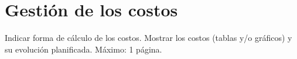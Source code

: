 \section{Gestión de los costos}

Indicar forma de cálculo de los costos.
Mostrar los costos (tablas y/o gráficos) y su evolución planificada.
Máximo: 1 página.
